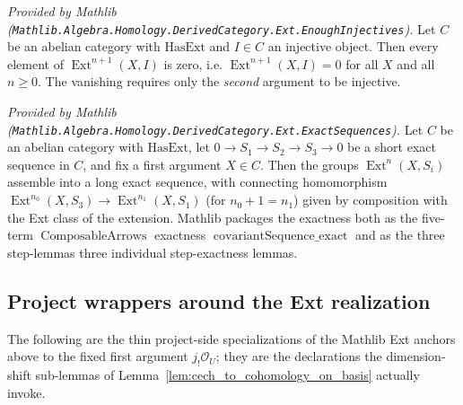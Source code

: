 \begin{lemma}
  \label{lem:ext_eq_zero_of_injective_mathlib}
  \mathlibok
  \textit{Provided by Mathlib
  (\texttt{Mathlib.Algebra.Homology.DerivedCategory.Ext.EnoughInjectives}).}
  Let \(C\) be an abelian category with \(\mathrm{HasExt}\) and \(I \in C\) an injective
  object. Then every element of \(\operatorname{Ext}^{n+1}(X, I)\) is zero, i.e.
  \(\operatorname{Ext}^{n+1}(X, I) = 0\) for all \(X\) and all \(n \geq 0\). The
  vanishing requires only the \emph{second} argument to be injective.
\end{lemma}

\begin{lemma}
  \label{lem:ext_covariant_les_mathlib}
  \mathlibok
  \textit{Provided by Mathlib
  (\texttt{Mathlib.Algebra.Homology.DerivedCategory.Ext.ExactSequences}).}
  Let \(C\) be an abelian category with \(\mathrm{HasExt}\), let \(0 \to S_1 \to S_2 \to
  S_3 \to 0\) be a short exact sequence in \(C\), and fix a first argument \(X \in C\).
  Then the groups \(\operatorname{Ext}^n(X, S_i)\) assemble into a long exact sequence,
  with connecting homomorphism \(\operatorname{Ext}^{n_0}(X, S_3) \to
  \operatorname{Ext}^{n_1}(X, S_1)\) (for \(n_0 + 1 = n_1\)) given by composition with
  the Ext class of the extension. Mathlib packages the exactness both as the
  five-term \(\operatorname{ComposableArrows}\) exactness
  \(\operatorname{covariantSequence\_exact}\) and as the three step-lemmas
  three individual step-exactness lemmas.
\end{lemma}

\subsection{Project wrappers around the Ext realization}

The following are the thin project-side specializations of the Mathlib Ext anchors above to the
fixed first argument \(j_!\mathcal{O}_U\); they are the declarations the dimension-shift sub-lemmas
of Lemma~\ref{lem:cech_to_cohomology_on_basis} actually invoke.

